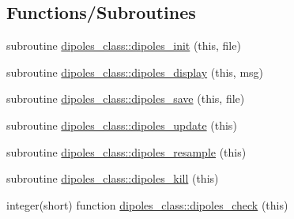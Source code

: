 \subsection*{Functions/\+Subroutines}
\begin{DoxyCompactItemize}
\item 
subroutine \hyperlink{namespacedipoles__class_a947aef5d45c6e39accc6c0e20f619c57}{dipoles\+\_\+class\+::dipoles\+\_\+init} (this, file)
\item 
subroutine \hyperlink{namespacedipoles__class_a732ca8b1573dd77731c6272ce551bc70}{dipoles\+\_\+class\+::dipoles\+\_\+display} (this, msg)
\item 
subroutine \hyperlink{namespacedipoles__class_a9ab428011961577796577f9cdeb032b4}{dipoles\+\_\+class\+::dipoles\+\_\+save} (this, file)
\item 
subroutine \hyperlink{namespacedipoles__class_a9157bf14add87f3f26edfbc88c0da6fe}{dipoles\+\_\+class\+::dipoles\+\_\+update} (this)
\item 
subroutine \hyperlink{namespacedipoles__class_a2d80cb493920a4619e0e83abfcb033f6}{dipoles\+\_\+class\+::dipoles\+\_\+resample} (this)
\item 
subroutine \hyperlink{namespacedipoles__class_ab610221599ac72fa22a02617e550033b}{dipoles\+\_\+class\+::dipoles\+\_\+kill} (this)
\item 
integer(short) function \hyperlink{namespacedipoles__class_acf34b0d8a2cae92c5b35a03eb9c0237b}{dipoles\+\_\+class\+::dipoles\+\_\+check} (this)
\end{DoxyCompactItemize}

